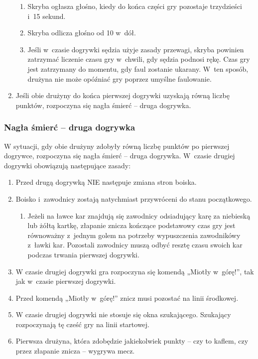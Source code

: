 \documentclass[12pt,a4paper]{article}
\begin{document}
\begin{enumerate}
\begin{enumerate}
		      \item Skryba ogłasza głośno, kiedy do końca części gry pozostaje
		            trzydzieści i~15 sekund.

		      \item Skryba odlicza głośno od 10 w~dół.

		      \item Jeśli w~czasie dogrywki sędzia użyje zasady przewagi, skryba
		            powinien zatrzymać liczenie czasu gry w~chwili, gdy sędzia podnosi rękę.
		            Czas gry jest zatrzymany do momentu, gdy faul zostanie ukarany. W~ten
		            sposób, drużyna nie może opóźniać gry poprzez umyślne faulowanie.
	      \end{enumerate}

	\item Jeśli obie drużyny do końca pierwszej dogrywki uzyskają równą liczbę
	      punktów, rozpoczyna się nagła śmierć -- druga dogrywka.
\end{enumerate}

\subsubsection{Nagła śmierć -- druga dogrywka}
W sytuacji, gdy obie
drużyny zdobyły równą liczbę punktów po pierwszej dogrywce, rozpoczyna
się nagła śmierć -- druga dogrywka. W~czasie drugiej dogrywki obowiązują
następujące zasady:

\begin{enumerate}
	\item Przed drugą dogrywką NIE następuje zmiana stron boiska.

	\item Boisko i~zawodnicy zostają natychmiast przywróceni do stanu
	      początkowego.
	      \begin{enumerate}
		      \item Jeżeli na ławce kar znajdują się zawodnicy odsiadujący karę za
		            niebieską lub żółtą kartkę, złapanie znicza kończące podstawowy czas gry
		            jest równoważny z~jednym golem na potrzeby wypuszczenia zawodnikówy z~ławki kar. Pozostali zawodnicy muszą odbyć resztę czasu swoich kar
		            podczas trwania pierwszej dogrywki.
	      \end{enumerate}
	\item W czasie drugiej dogrywki gra rozpoczyna się komendą „Miotły w~górę!'', tak jak w~czasie pierwszej dogrywki.

	\item Przed komendą „Miotły w~górę!'' znicz musi pozostać na linii środkowej.

	\item W czasie drugiej dogrywki nie stosuje się okna szukającego. Szukający
	      rozpoczynają tę cześć gry na linii startowej.

	\item Pierwsza drużyna, która zdobędzie jakiekolwiek punkty -- czy to
	      kaflem, czy przez złapanie znicza -- wygrywa mecz.
\end{enumerate}
\end{document}
